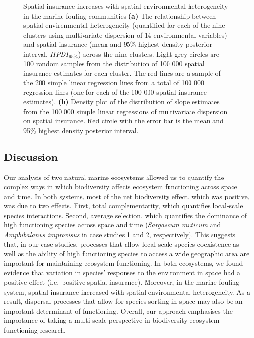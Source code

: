 \documentclass[
  letterpaper,
  DIV=11,
  numbers=noendperiod]{scrartcl}
\begin{document}
\begin{figure}


\caption{\label{fig-m5}Spatial insurance increases with spatial
environmental heterogeneity in the marine fouling communities
\textbf{(a)} The relationship between spatial environmental
heterogeneity (quantified for each of the nine clusters using
multivariate dispersion of 14 environmental variables) and spatial
insurance (mean and 95\% highest density posterior interval,
\(HPDI_{95\%}\)) across the nine clusters. Light grey circles are 100
random samples from the distribution of 100 000 spatial insurance
estimates for each cluster. The red lines are a sample of the 200 simple
linear regression lines from a total of 100 000 regression lines (one
for each of the 100 000 spatial insurance estimates). \textbf{(b)}
Density plot of the distribution of slope estimates from the 100 000
simple linear regressions of multivariate dispersion on spatial
insurance. Red circle with the error bar is the mean and 95\% highest
density posterior interval.}

\end{figure}%

\subsection{Discussion}\label{discussion}

Our analysis of two natural marine ecosystems allowed us to quantify the
complex ways in which biodiversity affects ecosystem functioning across
space and time. In both systems, most of the net biodiversity effect,
which was positive, was due to two effects. First, total
complementarity, which quantifies local-scale species interactions.
Second, average selection, which quantifies the dominance of high
functioning species across space and time (\emph{Sargassum muticum} and
\emph{Amphibalanus improvisus} in case studies 1 and 2, respectively).
This suggests that, in our case studies, processes that allow
local-scale species coexistence as well as the ability of high
functioning species to access a wide geographic area are important for
maintaining ecosystem functioning. In both ecosystems, we found evidence
that variation in species' responses to the environment in space had a
positive effect (i.e.~positive spatial insurance). Moreover, in the
marine fouling system, spatial insurance increased with spatial
environmental heterogeneity. As a result, dispersal processes that allow
for species sorting in space may also be an important determinant of
functioning. Overall, our approach emphasises the importance of taking a
multi-scale perspective in biodiversity-ecosystem functioning research.
\end{document}
